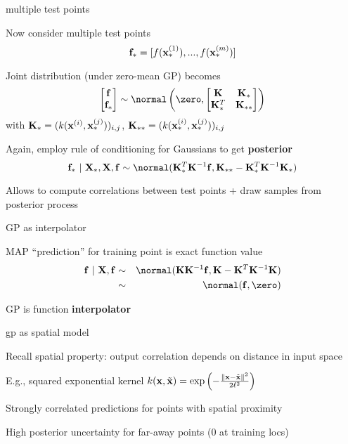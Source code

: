 \documentclass[11pt,compress,t,notes=noshow, xcolor=table]{beamer}
\begin{document}
\begin{framei}[sep=L]{multiple test points}
\item Now consider multiple test points
$$\fv_* = [f(\xi[1]_*), ..., f(\xi[m]_*)]$$
\item Joint distribution (under zero-mean GP) becomes
$$
    \begin{bmatrix} \fv \\ \fv_* \end{bmatrix} \sim  
    \normal\left(\zero, \begin{bmatrix} \Kmat & \Kmat_* \\ \Kmat_*^T & \Kmat_{**} \end{bmatrix}\right)
  $$
with $\Kmat_* = (k(\xi, \xv_*^{(j)}))_{i,j}$, $\Kmat_{**} = (k(\xi[i]_*, \xi[j]_*))_{i,j}$
\item Again, employ rule of conditioning for Gaussians to get \textbf{posterior}
$$\fv_* ~|~ \Xmat_*, \Xmat, \fv \sim \normal(\Kmat_{*}^{T}\Kmat^{-1}\fv, \Kmat_{**} - \Kmat_*^T \Kmat ^{-1}\Kmat_*)$$
\item Allows to compute correlations between test points + draw samples from posterior process
\end{framei}

\begin{framei}[sep=L]{GP as interpolator}
\item MAP ``prediction'' for training point is exact function value
\begin{eqnarray*}
\fv ~|~ \Xmat, \fv &\sim& \normal(\Kmat\Kmat^{-1}\fv, \Kmat - \Kmat^T \Kmat^{-1} \Kmat) \\ &\sim& \normal(\fv, \zero)
\end{eqnarray*}
\item GP is function \textbf{interpolator}
\vfill
{}
\end{framei}

\begin{framei}[sep=M]{gp as spatial model}
\item Recall spatial property: output correlation depends on distance in input space
\item E.g., squared exponential kernel $k(\xv, \tilde{\xv}) = \exp \left(-\frac{\| \xv - \tilde{\xv} \|^2}{2\ls^2} \right)$
\item Strongly correlated predictions for points with spatial proximity
\item High posterior uncertainty for far-away points (0 at training locs)
\vfill
{}
\end{framei}
\end{document}
